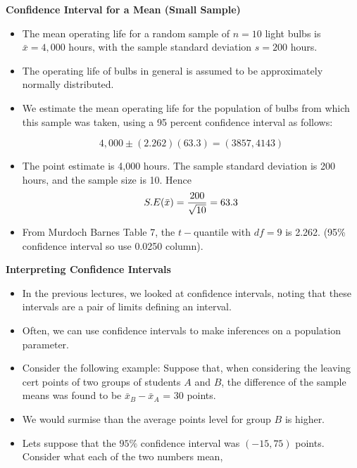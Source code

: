 
\noindent \textbf{Confidence Interval for a Mean (Small Sample)}
\begin{itemize}
\item The mean operating life for a random sample of $n = 10$ light bulbs is $\bar{x} = 4,000$ hours, with the sample
standard deviation $s = 200$ hours. \item The operating life of bulbs in general is assumed to be approximately normally distributed.\item
We estimate the mean operating life for the population of bulbs from which this sample was taken, using a 95 percent
confidence interval as follows:

\[4,000\pm(2.262)(63.3)  = (3857,4143)\]

\item The point estimate is 4,000 hours. The sample standard deviation is 200 hours, and the sample size is 10. Hence \[S.E(\bar{x} ) = { 200 \over \sqrt{10}} = 63.3\]

\item From Murdoch Barnes Table 7, the $t-$quantile with $df=9$ is 2.262. (95\% confidence interval so use 0.0250 column).
\end{itemize}



\noindent \textbf{Interpreting Confidence Intervals}
\begin{itemize}
\item In the previous lectures, we looked at confidence intervals, noting that these intervals are a pair of limits defining an interval.
\item Often, we can use confidence intervals to make inferences on a population parameter.
\item Consider the following example: Suppose that, when considering the leaving cert points of two groups of students $A$ and $B$, the difference of the sample means was found to be $\bar{x}_B-\bar{x}_A$ = 30 points.
\item We would surmise than the average points level for group $B$ is higher.
\item Lets suppose that the $95\%$ confidence interval was $(-15,75)$ points. Consider what each of the two numbers mean,
\end{itemize}



